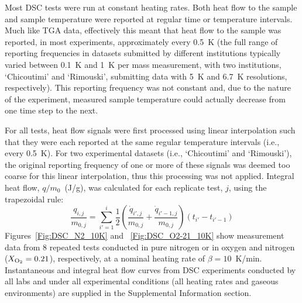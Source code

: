 \documentclass{book}
\begin{document}
Most DSC tests were run at constant heating rates. Both heat flow to the sample and sample temperature were reported at regular time or temperature intervals. Much like TGA data, effectively this meant that heat flow to the sample was reported, in most experiments, approximately every 0.5~K (the full range of reporting frequencies in datasets submitted by different institutions typically varied between 0.1~K and 1~K per mass measurement, with two institutions, ‘Chicoutimi’ and ‘Rimouski’, submitting data with 5~K and 6.7~K resolutions, respectively). This reporting frequency was not constant and, due to the nature of the experiment, measured sample temperature could actually decrease from one time step to the next.

For all tests, heat flow signals were first processed using linear interpolation such that they were each reported at the same regular temperature intervals (i.e., every 0.5~K). For two experimental datasets (i.e., ‘Chicoutimi’ and ‘Rimouski’), the original reporting frequency of one or more of these signals was deemed too coarse for this linear interpolation, thus this processing was not applied. Integral heat flow, $q/m_0$~(J/g), was calculated for each replicate test, $j$, using the trapezoidal rule:
\begin{equation}
\frac{q_{i,j}}{m_{0,j}} = \sum_{i'=1}^i \frac{1}{2} \left( \frac{\dot{q}_{i',j}}{m_{0,j}} + \frac{\dot{q}_{i'-1,j}}{m_{0,j}} \right) \left(t_{i'}-t_{i'-1} \right)
\end{equation}
Figures~\ref{Fig:DSC_N2_10K} and ~\ref{Fig:DSC_O2-21_10K} show measurement data from 8 repeated tests conducted in pure nitrogen or in oxygen and nitrogen ($X_{\rm O_2}=0.21$), respectively, at a nominal heating rate of $\beta=10$~K/min. Instantaneous and integral heat flow curves from DSC experiments conducted by all labs and under all experimental conditions (all heating rates and gaseous environments) are supplied in the Supplemental Information section.
\end{document}
